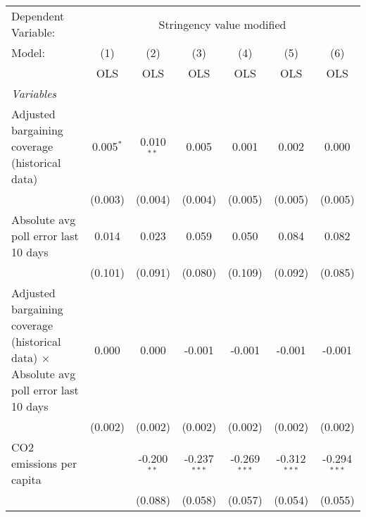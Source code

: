 
\begingroup
\centering
\begin{tabular}{lcccccc}
   \toprule
   Dependent Variable: & \multicolumn{6}{c}{Stringency value modified}\\
   Model:                                                                                        & (1)         & (2)           & (3)            & (4)            & (5)            & (6)\\  
                                                                                                 &  OLS        & OLS           & OLS            & OLS            & OLS            & OLS\\  
   \midrule
   \emph{Variables}\\
   Adjusted bargaining coverage (historical data)                                                & 0.005$^{*}$ & 0.010$^{**}$  & 0.005          & 0.001          & 0.002          & 0.000\\   
                                                                                                 & (0.003)     & (0.004)       & (0.004)        & (0.005)        & (0.005)        & (0.005)\\   
   Absolute avg poll error last 10 days                                                          & 0.014       & 0.023         & 0.059          & 0.050          & 0.084          & 0.082\\   
                                                                                                 & (0.101)     & (0.091)       & (0.080)        & (0.109)        & (0.092)        & (0.085)\\   
   Adjusted bargaining coverage (historical data) $\times$ Absolute avg poll error last 10 days  & 0.000       & 0.000         & -0.001         & -0.001         & -0.001         & -0.001\\   
                                                                                                 & (0.002)     & (0.002)       & (0.002)        & (0.002)        & (0.002)        & (0.002)\\   
   CO2 emissions per capita                                                                      &             & -0.200$^{**}$ & -0.237$^{***}$ & -0.269$^{***}$ & -0.312$^{***}$ & -0.294$^{***}$\\   
                                                                                                 &             & (0.088)       & (0.058)        & (0.057)        & (0.054)        & (0.055)\\   

\end{tabular}
